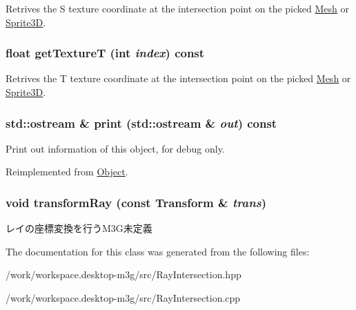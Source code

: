 Retrives the S texture coordinate at the intersection point on the picked \hyperlink{classm3g_1_1Mesh}{Mesh} or \hyperlink{classm3g_1_1Sprite3D}{Sprite3D}. \hypertarget{classm3g_1_1RayIntersection_843d5b907bb54a6f28571f0a0f14c932}{
\subsubsection[{getTextureT}]{\setlength{\rightskip}{0pt plus 5cm}float getTextureT (int {\em index}) const}}
\label{classm3g_1_1RayIntersection_843d5b907bb54a6f28571f0a0f14c932}


Retrives the T texture coordinate at the intersection point on the picked \hyperlink{classm3g_1_1Mesh}{Mesh} or \hyperlink{classm3g_1_1Sprite3D}{Sprite3D}. \hypertarget{classm3g_1_1RayIntersection_6fea17fa1532df3794f8cb39cb4f911f}{
\subsubsection[{print}]{\setlength{\rightskip}{0pt plus 5cm}std::ostream \& print (std::ostream \& {\em out}) const}}
\label{classm3g_1_1RayIntersection_6fea17fa1532df3794f8cb39cb4f911f}


Print out information of this object, for debug only. 

Reimplemented from \hyperlink{classm3g_1_1Object_6fea17fa1532df3794f8cb39cb4f911f}{Object}.\hypertarget{classm3g_1_1RayIntersection_ee558b3e4c2a54d66f2bb47e3dea6188}{
\subsubsection[{transformRay}]{\setlength{\rightskip}{0pt plus 5cm}void transformRay (const {\bf Transform} \& {\em trans})}}
\label{classm3g_1_1RayIntersection_ee558b3e4c2a54d66f2bb47e3dea6188}


レイの座標変換を行うM3G未定義 

The documentation for this class was generated from the following files:\begin{CompactItemize}
\item 
/work/workspace.desktop-m3g/src/RayIntersection.hpp\item 
/work/workspace.desktop-m3g/src/RayIntersection.cpp\end{CompactItemize}
